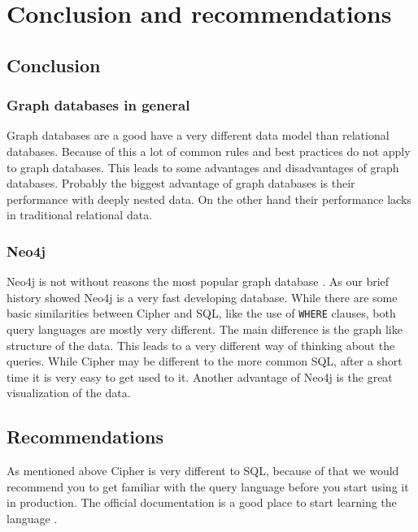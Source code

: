 \section{Conclusion and recommendations}
\subsection{Conclusion}
\subsubsection{Graph databases in general}
Graph databases are a good have a very different data model than relational
databases. Because of this a lot of common rules and best practices do not apply
to graph databases. This leads to some advantages and disadvantages of graph
databases. Probably the biggest advantage of graph databases is their
performance with deeply nested data. On the other hand their performance lacks
in traditional relational data.

\subsubsection{Neo4j}
Neo4j is not without reasons the most popular graph database
\parencite{db-engines}. As our brief history showed
Neo4j is a very fast developing database. While there are some basic
similarities between Cipher and SQL, like the use of \texttt{WHERE} clauses,
both query languages are mostly very different. The main difference is the graph
like structure of the data. This leads to a very different way of thinking about
the queries. While Cipher may be different to the more common SQL, after a short
time it is very easy to get used to it. Another advantage of Neo4j is the great
visualization of the data.

\subsection{Recommendations}
As mentioned above Cipher is very different to SQL, because of that we would
recommend you to get familiar with the query language before you start using it
in production. The official documentation is a good place to start learning the
language \parencite{neo4j:cypher-manual}.

